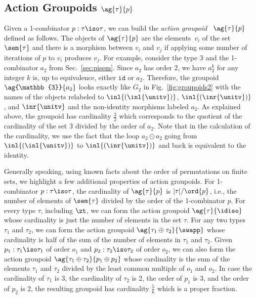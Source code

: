 \subsection{Action Groupoids $\ag{\tau}{p}$}

Given a 1-combinator $p : \tau \iso \tau$, we can build the
\emph{action groupoid}~\cite{groupoidintro} $\ag{\tau}{p}$ defined as
follows. The objects of $\ag{\tau}{p}$ are the elements~$v_i$ of the
set $\sem{\tau}$ and there is a morphism between $v_i$ and $v_j$ if
applying some number of iterations of $p$ to $v_i$ produces $v_j$. For
example, consider the type $\mathbb{3}$ and the 1-combinator $a_2$
from Sec.~\ref{sec:pisem}. Since $a_2$ has order 2, we have $a_2 ^ k$
for any integer $k$ is, up to equivalence, either $\texttt{id}$ or
$a_2$. Therefore, the groupoid $\ag{\mathbb{3}}{a_2}$ looks exactly
like $G_2$ in Fig.~\ref{fig:groupoids2} with the names of the objects
relabeled to $\inl{(\inl{\unitv})}$, $\inl{(\inr{\unitv})}$, and
$\inr{\unitv}$ and the non-identity morphisms labeled $a_2$. As
explained above, the groupoid has cardinality $\frac{3}{2}$ which
corresponds to the quotient of the cardinality of the set $\mathbb{3}$
divided by the order of $a_2$. Note that in the calculation of the
cardinality, we use the fact that the loop $a_2 \odot a_2$ going from
$\inl{(\inl{\unitv})}$ to $\inl{(\inr{\unitv})}$ and back is
equivalent to the identity.

Generally speaking, using known facts about the order of permutations
on finite sets, we highlight a few additional properties of action
groupoids. For 1-combinator $p : \tau \iso \tau$, the cardinality of
$\ag{\tau}{p}$ is $|\tau|/\ord{p}$, i.e., the number of elements of
$\sem{\tau}$ divided by the order of the 1-combinator $p$.  For every
type $\tau$, including $\zt$, we can form the action groupoid
$\ag{\tau}{\idiso}$ whose cardinality is just the number of elements
in the set $\tau$. For any two types $\tau_1$ and $\tau_2$, we can
form the action groupoid $\ag{\tau_1\oplus\tau_2}{\swapp}$ whose
cardinality is half of the sum of the number of elements in $\tau_1$
and $\tau_2$. Given $p_1 : \tau_1 \iso \tau_1$ of order $o_1$ and
$p_2 : \tau_2 \iso \tau_2$ of order $o_2$, we can also form the action
groupoid $\ag{\tau_1\oplus\tau_2}{p_1\oplus p_2}$ whose cardinality is
the sum of the elements $\tau_1$ and $\tau_2$ divided by the least
common multiple of $o_1$ and $o_2$. In case the cardinality of
$\tau_1$ is 3, the cardinality of $\tau_2$ is 2, the order of $p_1$ is
3, and the order of $p_2$ is 2, the resulting groupoid has cardinality
$\frac{5}{6}$ which is a proper fraction.

